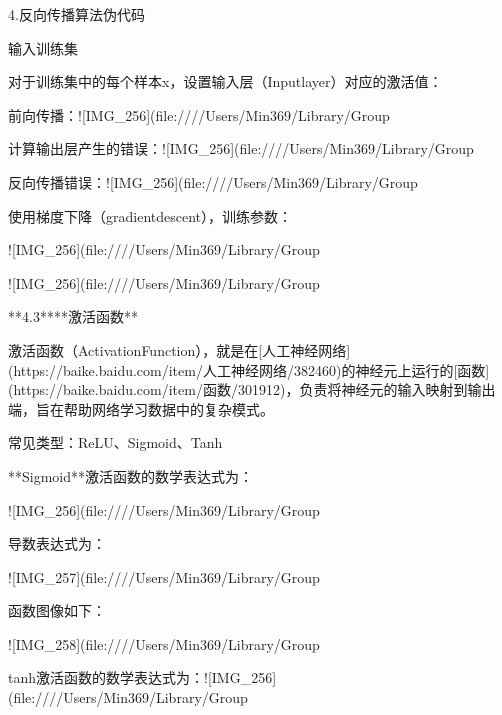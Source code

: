 4.反向传播算法伪代码



输入训练集



对于训练集中的每个样本x，设置输入层（Inputlayer）对应的激活值：

前向传播：![IMG_256](file:////Users/Min369/Library/Group%

计算输出层产生的错误：![IMG_256](file:////Users/Min369/Library/Group%

反向传播错误：![IMG_256](file:////Users/Min369/Library/Group%

使用梯度下降（gradientdescent），训练参数：

![IMG_256](file:////Users/Min369/Library/Group%

![IMG_256](file:////Users/Min369/Library/Group%

**4.3****激活函数**

激活函数（ActivationFunction），就是在[人工神经网络](https://baike.baidu.com/item/人工神经网络/382460)的神经元上运行的[函数](https://baike.baidu.com/item/函数/301912)，负责将神经元的输入映射到输出端，旨在帮助网络学习数据中的复杂模式。

常见类型：ReLU、Sigmoid、Tanh



**Sigmoid**激活函数的数学表达式为：

​![IMG_256](file:////Users/Min369/Library/Group%

导数表达式为：

![IMG_257](file:////Users/Min369/Library/Group%

函数图像如下：

![IMG_258](file:////Users/Min369/Library/Group%



tanh激活函数的数学表达式为：![IMG_256](file:////Users/Min369/Library/Group%

